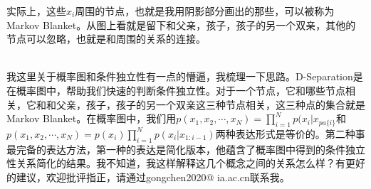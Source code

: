 \documentclass[a4paper]{article}
\begin{document}
实际上，这些$x_i$周围的节点，也就是我用阴影部分画出的那些，可以被称为Markov Blanket。从图上看就是留下和父亲，孩子，孩子的另一个双亲，其他的节点可以忽略，也就是和周围的关系的连接。

~\\

我这里关于概率图和条件独立性有一点的懵逼，我梳理一下思路。D-Separation是在概率图中，帮助我们快速的判断条件独立性。对于一个节点，它和哪些节点相关，它和和父亲，孩子，孩子的另一个双亲这三种节点相关，这三种点的集合就是Markov Blanket。在概率图中，我们用$p(x_1,x_2,\cdots,x_N)=\prod_{i=1}^Np(x_i|x_{pa\{i\}}$和$p(x_1,x_2,\cdots,x_N)=p(x_i)\prod_{i=1}^Np(x_i|x_{1:i-1})$两种表达形式是等价的。第二种事最完备的表达方法，第一种的表达是简化版本，他蕴含了概率图中得到的条件独立性关系简化的结果。我不知道，我这样解释这几个概念之间的关系怎么样？有更好的建议，欢迎批评指正，请通过gongchen2020@ ia.ac.cn联系我。
\end{document}
